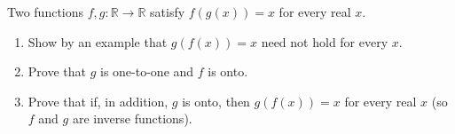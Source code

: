 Two functions $f,g:\mathbb R\to\mathbb R$ satisfy $f(g(x))=x$ for every real $x$.
\begin{enumerate}
\item[(a)] Show by an example that $g(f(x))=x$ need not hold for every $x$.
\item[(b)] Prove that $g$ is one-to-one and $f$ is onto.
\item[(c)] Prove that if, in addition, $g$ is onto, then $g(f(x))=x$ for every real $x$ (so $f$ and $g$ are inverse functions).
\end{enumerate}
